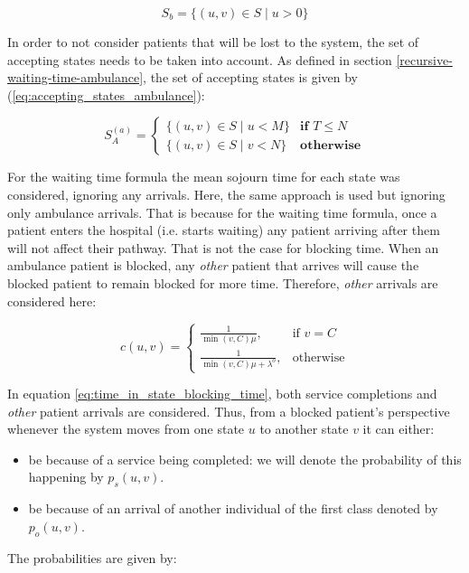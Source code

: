\begin{equation*}
    S_b = \{(u,v) \in S \; | \; u > 0\}
\end{equation*}
 
In order to not consider patients that will be lost to the system, the set of accepting  %
states needs to be taken into account. As defined in section \ref{recursive-waiting-time-ambulance},
the set of accepting states is given by (\ref{eq:accepting_states_ambulance}):

\begin{equation*}
    S_A^{(a)}=
    \begin{cases}
        \{(u, v) \in S \; | \; u < M \} & \textbf{if } T \leq N\\
        \{(u, v) \in S \; | \; v < N \} & \textbf{otherwise}
    \end{cases}
\end{equation*}

For the waiting time formula the mean sojourn time for each state was considered,
ignoring any arrivals. Here, the same approach is used but ignoring only ambulance  %
arrivals. That is because for the waiting time formula, once a patient enters the  %
hospital (i.e. starts waiting) any patient arriving after them will not affect their
pathway. That is not the case for blocking time. When an ambulance patient is blocked,  %
any \textit{other} patient that arrives will cause the blocked patient to remain 
blocked for more time. Therefore, \textit{other} arrivals are considered here:

\begin{equation}\label{eq:time_in_state_blocking_time}
    c(u,v) = 
    \begin{cases}
        \frac{1}{\min(v,C) \mu}, & \text{if } v = C\\
        \frac{1}{\min(v,C) \mu + \lambda^o}, & \text{otherwise}
    \end{cases}
\end{equation}
 
In equation \ref{eq:time_in_state_blocking_time}, both service completions and 
\textit{other} patient arrivals are considered. 
Thus, from a blocked patient's perspective whenever the system moves from one state \(u\)
to another state \(v\) it can either:

\begin{itemize}
    \item be because of a service being completed: we will denote the probability of this happening by \(p_s(u,v)\). 
    \item be because of an arrival of another individual of the first class denoted by \(p_o(u,v)\).  %
\end{itemize}
The probabilities are given by:

